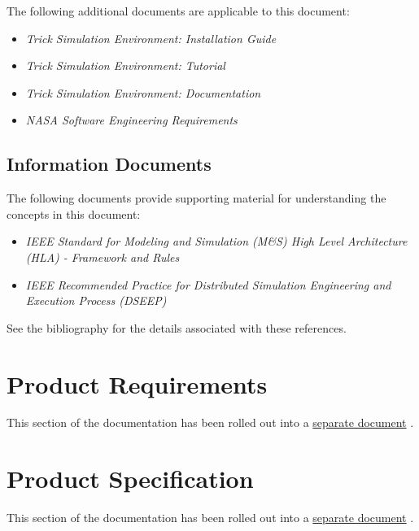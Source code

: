 \documentclass[twoside,11pt,titlepage]{report}
\begin{document}
The following additional documents are applicable to this document:
\begin{itemize}
\item{\em Trick Simulation Environment: Installation Guide}
\cite{Trick:Install}

\item{\em Trick Simulation Environment: Tutorial}
\cite{Trick:Tutorial}

\item{\em Trick Simulation Environment: Documentation}
\cite{Trick:Documentation}

\item{\em NASA Software Engineering Requirements}
\cite{NASA:SWE}

\end{itemize}

\section{Information Documents}
The following documents provide supporting material for understanding the
concepts in this document:

\begin{itemize}
\item{\em IEEE Standard for Modeling and Simulation (M\&S) High Level
          Architecture (HLA) - Framework and Rules}
\cite{IEEE1516:FRAMEWORK}

\item{\em IEEE Recommended Practice for Distributed Simulation Engineering
          and Execution Process (DSEEP)}
\cite{IEEE1730:DSEEP}

\end{itemize}

See the bibliography for the details associated with these references.


\chapter{Product Requirements}

This section of the documentation has been rolled out into a
\href{file:TrickHLAReqt.pdf}{separate document}
\cite{trickhlaenv:TrickHLAReqt}.

\chapter{Product Specification}

This section of the documentation has been rolled out into a
\href{file:TrickHLASpec.pdf}{separate document}
\cite{trickhlaenv:TrickHLASpec}.
\end{document}
